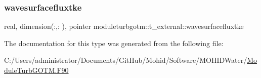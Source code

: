 \mbox{\label{structmoduleturbgotm_1_1t__external_a7e354db28ef0073d579d1d2210d46b5a}} 
\subsubsection{\texorpdfstring{wavesurfacefluxtke}{wavesurfacefluxtke}}
{\footnotesize\ttfamily real, dimension(\+:,\+:  ), pointer moduleturbgotm\+::t\+\_\+external\+::wavesurfacefluxtke\hspace{0.3cm}{\ttfamily [private]}}



The documentation for this type was generated from the following file\+:\begin{DoxyCompactItemize}
\item 
C\+:/\+Users/administrator/\+Documents/\+Git\+Hub/\+Mohid/\+Software/\+M\+O\+H\+I\+D\+Water/\mbox{\hyperlink{_module_turb_g_o_t_m_8_f90}{Module\+Turb\+G\+O\+T\+M.\+F90}}\end{DoxyCompactItemize}
